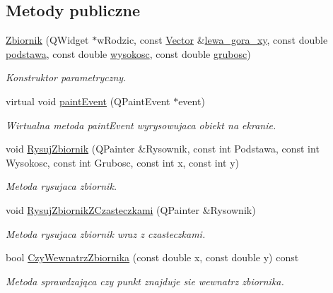 \subsection*{Metody publiczne}
\begin{DoxyCompactItemize}
\item 
\hyperlink{class_zbiornik_ae1364f0b3812ec8c36d03cea33cbfd9c}{Zbiornik} (Q\-Widget $\ast$w\-Rodzic, const \hyperlink{class_vector}{Vector} \&\hyperlink{class_zbiornik_a811829ed13289d4fad56ae5fcd92bec8}{lewa\-\_\-gora\-\_\-xy}, const double \hyperlink{class_zbiornik_ac64f411a313024c52dbc1c18897df573}{podstawa}, const double \hyperlink{class_zbiornik_a72ab0eb9f3562de0ea90e176f515be42}{wysokosc}, const double \hyperlink{class_zbiornik_a34b0e660d8d6c4d1f45f06f5063b9788}{grubosc})
\begin{DoxyCompactList}\small\item\em Konstruktor parametryczny. \end{DoxyCompactList}\item 
virtual void \hyperlink{class_zbiornik_af7a9c185e95b92de342c6dc69f020765}{paint\-Event} (Q\-Paint\-Event $\ast$event)
\begin{DoxyCompactList}\small\item\em Wirtualna metoda paint\-Event wyrysowujaca obiekt na ekranie. \end{DoxyCompactList}\item 
void \hyperlink{class_zbiornik_ad15f40d418d9ebf261de0eabe8cc2906}{Rysuj\-Zbiornik} (Q\-Painter \&Rysownik, const int Podstawa, const int Wysokosc, const int Grubosc, const int x, const int y)
\begin{DoxyCompactList}\small\item\em Metoda rysujaca zbiornik. \end{DoxyCompactList}\item 
void \hyperlink{class_zbiornik_af831a2751191eab54fb6438392ac6edb}{Rysuj\-Zbiornik\-Z\-Czasteczkami} (Q\-Painter \&Rysownik)
\begin{DoxyCompactList}\small\item\em Metoda rysujaca zbiornik wraz z czasteczkami. \end{DoxyCompactList}\item 
bool \hyperlink{class_zbiornik_a60fd88e85e8696cfec92cd24609e7410}{Czy\-Wewnatrz\-Zbiornika} (const double x, const double y) const 
\begin{DoxyCompactList}\small\item\em Metoda sprawdzająca czy punkt znajduje sie wewnatrz zbiornika. \end{DoxyCompactList}\item 

\end{DoxyCompactItemize}
